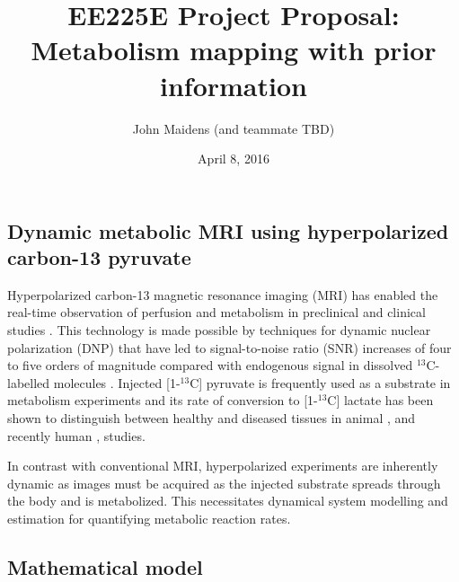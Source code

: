 \documentclass{article}
\begin{document}
\title{EE225E Project Proposal: \\
Metabolism mapping with prior information 
}
\author{John Maidens (and teammate TBD)}
\date{April 8, 2016} 

\maketitle


\subsection{Dynamic metabolic MRI using hyperpolarized carbon-13 pyruvate}


Hyperpolarized carbon-13 magnetic resonance imaging (MRI) has enabled the real-time observation of perfusion and metabolism in preclinical and clinical studies \cite{Golman06, Day07, Kazan13, Nelson13, Bahrami14, Swisher14}. This technology is made possible by techniques for dynamic nuclear polarization (DNP) that have led to signal-to-noise ratio (SNR) increases of four to five orders of magnitude compared with endogenous signal in dissolved $^{13}$C-labelled molecules  \cite{Ardenkjaer-Larsen03, Golman03}.  Injected [1-$^{13}$C] pyruvate is frequently used as a substrate in metabolism experiments and its rate of conversion to  [1-$^{13}$C] lactate has been shown to distinguish between healthy and diseased tissues in animal \cite{Day07}, and recently human \cite{Nelson13}, studies. 

In contrast with conventional MRI, hyperpolarized experiments are inherently dynamic as images must be acquired as the injected substrate spreads through the body and is metabolized. This necessitates dynamical system modelling and estimation for quantifying metabolic reaction rates. 

\subsection{Mathematical model} 
\end{document}
